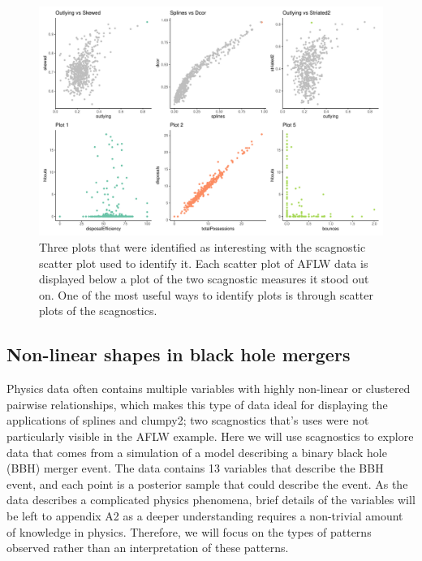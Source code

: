 \begin{Schunk}
\begin{figure}

{\centering \includegraphics[width=1\linewidth]{mason-lee-laa-cook_files/figure-latex/threeplot-static-1} 

}

\caption[Three plots that were identified as interesting with the scagnostic scatter plot used to identify it]{Three plots that were identified as interesting with the scagnostic scatter plot used to identify it. Each scatter plot of AFLW data is displayed below a plot of the two scagnostic measures it stood out on. One of the most useful ways to identify plots is through scatter plots of the scagnostics.}\label{fig:threeplot-static}
\end{figure}
\end{Schunk}

\hypertarget{non-linear-shapes-in-black-hole-mergers}{%
\subsection{Non-linear shapes in black hole
mergers}\label{non-linear-shapes-in-black-hole-mergers}}

Physics data often contains multiple variables with highly non-linear or
clustered pairwise relationships, which makes this type of data ideal
for displaying the applications of splines and clumpy2; two scagnostics
that's uses were not particularly visible in the AFLW example. Here we
will use scagnostics to explore data that comes from a simulation of a
model describing a binary black hole (BBH) merger event. The data
contains 13 variables that describe the BBH event, and each point is a
posterior sample that could describe the event. As the data describes a
complicated physics phenomena, brief details of the variables will be
left to appendix A2 as a deeper understanding requires a non-trivial
amount of knowledge in physics. Therefore, we will focus on the types of
patterns observed rather than an interpretation of these patterns.

